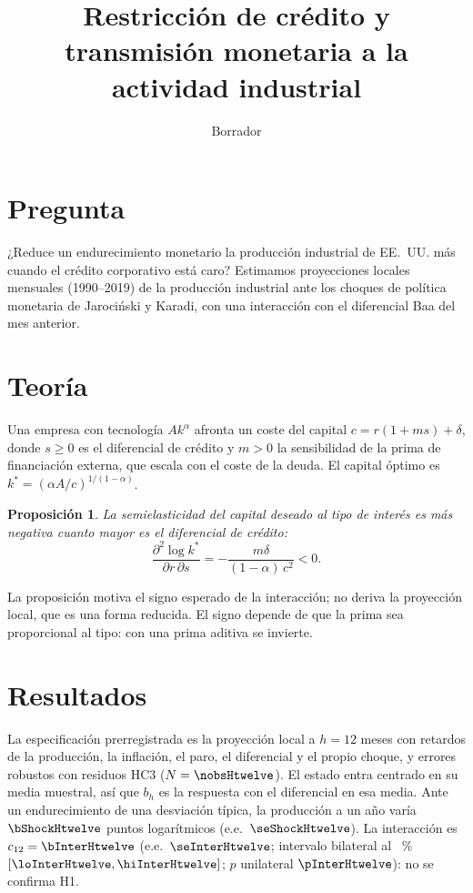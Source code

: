 \documentclass[11pt]{article}
\title{Restricción de crédito y transmisión monetaria a la actividad industrial}
\date{Borrador}
\newtheorem{proposition}{Proposición}
\begin{document}
\maketitle

\section{Pregunta}
¿Reduce un endurecimiento monetario la producción industrial de EE.~UU. más cuando el crédito corporativo está caro?
Estimamos proyecciones locales mensuales (1990--2019) de la producción industrial ante los choques de política monetaria
de Jarociński y Karadi, con una interacción con el diferencial Baa del mes anterior.

\section{Teoría}
Una empresa con tecnología $A k^\alpha$ afronta un coste del capital $c = r(1 + m s) + \delta$, donde $s \geq 0$ es el
diferencial de crédito y $m > 0$ la sensibilidad de la prima de financiación externa, que escala con el coste de la
deuda. El capital óptimo es $k^* = (\alpha A / c)^{1/(1-\alpha)}$.

\begin{proposition}
La semielasticidad del capital deseado al tipo de interés es más negativa cuanto mayor es el diferencial de crédito:
\[
  \frac{\partial^2 \log k^*}{\partial r \, \partial s} = -\frac{m \delta}{(1-\alpha)\, c^2} < 0 .
\]
\end{proposition}

La proposición motiva el signo esperado de la interacción; no deriva la proyección local, que es una forma reducida.
El signo depende de que la prima sea proporcional al tipo: con una prima aditiva se invierte.

\section{Resultados}
La especificación prerregistrada es la proyección local a $h = 12$ meses con \lags{} retardos de la producción, la
inflación, el paro, el diferencial y el propio choque, y errores robustos con residuos HC3 ($N = \nobsHtwelve$). El
estado entra centrado en su media muestral, así que $b_h$ es la respuesta con el diferencial en esa media. Ante un
endurecimiento de una desviación típica, la producción a un año varía $\bShockHtwelve$ puntos logarítmicos
(e.e.~$\seShockHtwelve$). La interacción es $c_{12} = \bInterHtwelve$ (e.e.~$\seInterHtwelve$; intervalo bilateral al
\ciLevel{}~\% $[\loInterHtwelve, \hiInterHtwelve]$; $p$ unilateral $\pInterHtwelve$): no se confirma H1.
\end{document}

